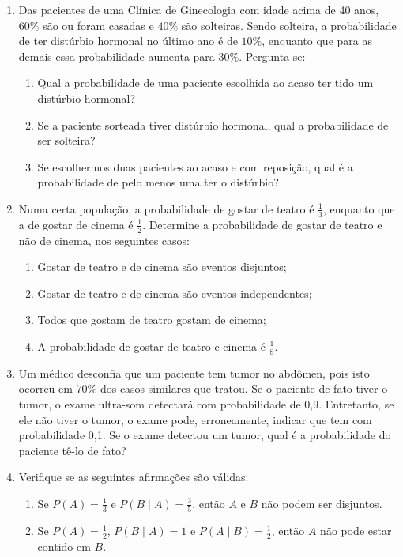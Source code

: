 \documentclass[12pt, a4paper]{article}
\begin{document}
\begin{enumerate}
\item Das pacientes de uma Clínica de Ginecologia com idade acima de 40 anos, $60\%$ são ou foram casadas e $40\%$ são solteiras. Sendo solteira, a probabilidade de ter distúrbio hormonal no último ano é de $10\%$, enquanto que para as demais essa probabilidade aumenta para $30\%$. Pergunta-se:
\begin{enumerate}
	\item Qual a probabilidade de uma paciente escolhida ao acaso ter tido um distúrbio hormonal?
	\item Se a paciente sorteada tiver distúrbio hormonal, qual a probabilidade de ser solteira?
	\item Se escolhermos duas pacientes ao acaso e com reposição, qual é a probabilidade de pelo menos uma ter o distúrbio?
\end{enumerate}
\item Numa certa população, a probabilidade de gostar de teatro é $\frac{1}{3}$, enquanto que a de gostar de cinema é $\frac{1}{2}$. Determine a probabilidade de gostar de teatro e não de cinema, nos seguintes casos:
\begin{enumerate}
	\item Gostar de teatro e de cinema são eventos disjuntos;
	\item Gostar de teatro e de cinema são eventos independentes;
	\item Todos que gostam de teatro gostam de cinema;
	\item A probabilidade de gostar de teatro e cinema é $\frac{1}{8}$.
\end{enumerate}

\item Um médico desconfia que um paciente tem tumor no abdômen, pois isto ocorreu em $70\%$ dos casos similares que tratou. Se o paciente de fato tiver o tumor, o exame ultra-som detectará com probabilidade de 0,9. Entretanto, se ele não tiver o tumor, o exame pode, erroneamente, indicar que tem com probabilidade 0,1. Se o exame detectou um tumor, qual é a probabilidade do paciente tê-lo de fato?

\item Verifique se as seguintes afirmações são válidas:
\begin{enumerate}
	\item Se $P(A)=\frac{1}{3}$ e $P(B \mid A) = \frac{3}{5}$, então $A$ e $B$ não podem ser disjuntos.
	\item Se $P(A)=\frac{1}{2}$, $P(B \mid A)=1$ e $P(A \mid B)=\frac{1}{2}$, então $A$ não pode estar contido em $B$.
\end{enumerate}


\end{enumerate}
\end{document}
